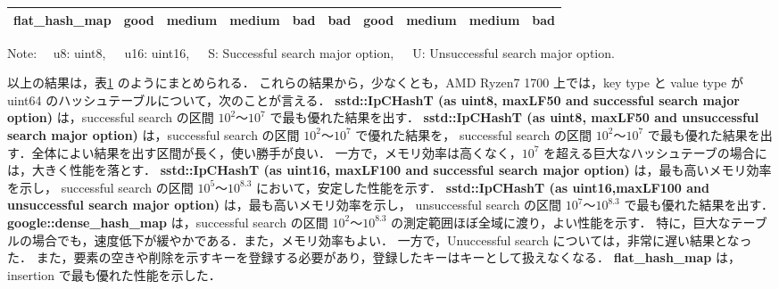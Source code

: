 \begin{table}
\begin{center}
\begin{tabular}{c|c|ccc|ccc|c|c}
        flat\_hash\_map        & \cellcolor{cGood}good   & \cellcolor{cMedi}medium & \cellcolor{cMedi}medium & \cellcolor{cBad }bad    & \cellcolor{cBad }bad    & \cellcolor{cGood}good   & \cellcolor{cMedi}medium  & \cellcolor{cMedi}medium & \cellcolor{cBad }bad  \rule[0pt]{0pt}{15pt} \\ \hline
    \end{tabular}
    Note: \ \ u8: uint8,\ \ \ u16: uint16,\ \ \ S: Successful search major option,\ \ \ U: Unsuccessful search major option.
    \label{table_hashT_cmp}
  \end{center}
\end{table}

以上の結果は，表\ref{table_hashT_cmp} のようにまとめられる．
これらの結果から，少なくとも，AMD Ryzen7 1700 上では，key type と value type が uint64 のハッシュテーブルについて，次のことが言える．
{\bf sstd::IpCHashT (as uint8, maxLF50 and successful search major option)} は，successful search の区間 $10^2〜10^7$ で最も優れた結果を出す．
{\bf sstd::IpCHashT (as uint8, maxLF50 and unsuccessful search major option)} は，successful search の区間 $10^2〜10^7$ で優れた結果を，
successful search の区間 $10^2〜10^7$ で最も優れた結果を出す．全体によい結果を出す区間が長く，使い勝手が良い．
一方で，メモリ効率は高くなく，$10^7$ を超える巨大なハッシュテーブの場合には，大きく性能を落とす．
{\bf sstd::IpCHashT (as uint16, maxLF100 and successful search major option)} は，最も高いメモリ効率を示し，
successful search の区間 $10^5〜10^8.3$ において，安定した性能を示す．
{\bf sstd::IpCHashT (as uint16,maxLF100 and unsuccessful search major option)} は，最も高いメモリ効率を示し，
unsuccessful search の区間 $10^7〜10^8.3$ で最も優れた結果を出す．
{\bf google::dense\_hash\_map} は，successful search の区間 $10^2〜10^8.3$ の測定範囲ほぼ全域に渡り，よい性能を示す．
特に，巨大なテーブルの場合でも，速度低下が緩やかである．また，メモリ効率もよい．
一方で，Unuccessful search については，非常に遅い結果となった．
また，要素の空きや削除を示すキーを登録する必要があり，登録したキーはキーとして扱えなくなる．
{\bf flat\_hash\_map} は，insertion で最も優れた性能を示した．







